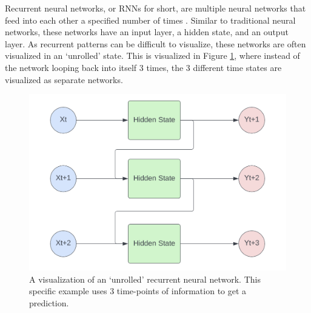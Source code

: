 Recurrent neural networks, or RNNs for short, are multiple neural networks that feed into each other a specified number of times \citep{rumelhart1986learning}. Similar to traditional neural networks, these networks have an input layer, a hidden state, and an output layer. As recurrent patterns can be difficult to visualize, these networks are often visualized in an `unrolled' state. This is visualized in Figure \ref{fig:RNN}, where instead of the network looping back into itself 3 times, the 3 different time states are visualized as separate networks.

\begin{figure}[ht]
    \centering
    \includegraphics[width=0.6\linewidth]{"Figures/Recurrent_NN.png"}
    \caption{A visualization of an `unrolled' recurrent neural network. This specific example uses 3 time-points of information to get a prediction.}
    \label{fig:RNN}
\end{figure}

